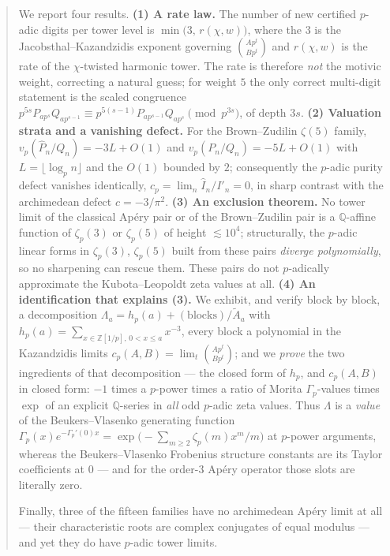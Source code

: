 \documentclass[11pt,reqno]{article}
\newcommand{\QQ}{\mathbb{Q}}
\newcommand{\ZZ}{\mathbb{Z}}
\newcommand{\Gp}{\Gamma_p}
\newcommand{\Ph}{\widehat{P}}
\newcommand{\Ih}{\widehat{I}}
\newcommand{\Ip}{I'}
\newcommand{\Atil}{\widetilde{A}}
\newcommand{\vp}{v_p}
\newcommand{\bin}[2]{\binom{#1}{#2}}
\newcommand{\floor}[1]{\lfloor #1 \rfloor}
\newcommand{\VER}[1]{{\normalfont\textsc{[verified:} #1\textsc{]}}}
\theoremstyle{plain}
\theoremstyle{definition}
\theoremstyle{remark}
\numberwithin{equation}{section}
\begin{document}
\begin{abstract}
We report four results.  \textbf{(1) A rate law.}  The number of new certified
$p$-adic digits per tower level is $\min\bigl(3,\,r(\chi,w)\bigr)$, where the
$3$ is the Jacobsthal--Kazandzidis exponent governing $\bin{Ap^t}{Bp^t}$ and
$r(\chi,w)$ is the rate of the $\chi$-twisted harmonic tower.  The rate is
therefore \emph{not} the motivic weight, correcting a natural guess; for weight
$5$ the only correct multi-digit statement is the scaled congruence
$p^{5s}P_{ap^s}Q_{ap^{s-1}}\equiv p^{5(s-1)}P_{ap^{s-1}}Q_{ap^{s}}
\pmod{p^{3s}}$, of depth $3s$.  \textbf{(2) Valuation strata and a vanishing
defect.}  For the Brown--Zudilin $\zeta(5)$ family, $\vp(\Ph_n/Q_n)=-3L+O(1)$
and $\vp(P_n/Q_n)=-5L+O(1)$ with $L=\floor{\log_p n}$ and the $O(1)$ bounded by
$2$; consequently the $p$-adic purity defect vanishes identically,
$c_p=\lim_n \Ih_n/\Ip_n=0$, in sharp contrast with the archimedean defect
$c=-3/\pi^2$.  \textbf{(3) An exclusion theorem.}  No tower limit of the
classical Ap\'ery pair or of the Brown--Zudilin pair is a $\QQ$-affine function
of $\zeta_p(3)$ or $\zeta_p(5)$ of height $\lesssim 10^4$; structurally, the
$p$-adic linear forms in $\zeta_p(3)$, $\zeta_p(5)$ built from these pairs
\emph{diverge polynomially}, so no sharpening can rescue them.  These pairs do
not $p$-adically approximate the Kubota--Leopoldt zeta values at all.
\textbf{(4) An identification that explains (3).}  We exhibit, and verify block
by block, a decomposition
$\Lambda_a=h_p(a)+(\text{blocks})/\Atil_a$ with
$h_p(a)=\sum_{x\in\ZZ[1/p],\,0<x\le a}x^{-3}$, every block a polynomial in the
Kazandzidis limits $c_p(A,B)=\lim_t\bin{Ap^t}{Bp^t}$; and we \emph{prove} the two
ingredients of that decomposition --- the closed form of $h_p$, and $c_p(A,B)$ in
closed form: $-1$ times a $p$-power times a ratio of Morita $\Gp$-values times $\exp$ of an
explicit $\QQ$-series in \emph{all} odd $p$-adic zeta values.  Thus $\Lambda$ is
a \emph{value} of the Beukers--Vlasenko generating function
$\Gp(x)e^{-\Gp'(0)x}=\exp\bigl(-\sum_{m\ge2}\zeta_p(m)x^m/m\bigr)$ at $p$-power
arguments, whereas the Beukers--Vlasenko Frobenius structure constants are its
Taylor coefficients at $0$ --- and for the order-$3$ Ap\'ery operator those
slots are literally zero.

Finally, three of the fifteen families have no archimedean Ap\'ery limit at all
--- their characteristic roots are complex conjugates of equal modulus --- and
yet they do have $p$-adic tower limits.
\end{abstract}
\end{document}
